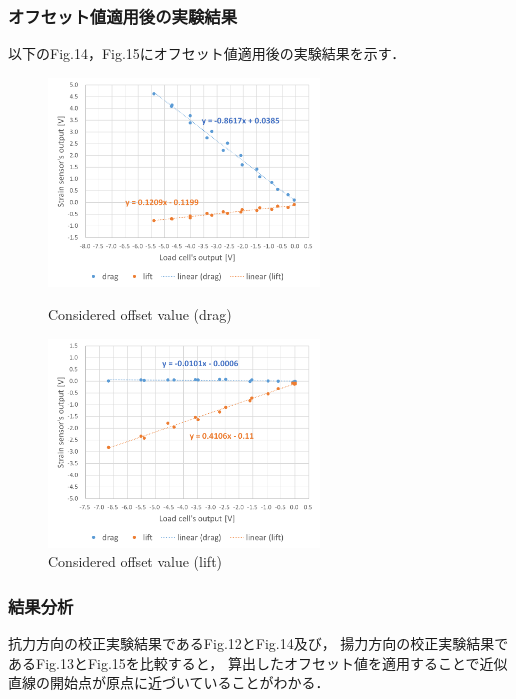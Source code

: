 \documentclass[twocolumn,a4j]{jsarticle}
\begin{document}
\subsubsection*{オフセット値適用後の実験結果}
以下のFig.14，Fig.15にオフセット値適用後の実験結果を示す．\\
\begin{figure}[htbp]
    \footnotesize
    \begin{center}
        \includegraphics[width=72mm]{../images/calibration_2_drag_offset.png}
        \caption{Considered offset value (drag)}
        \includegraphics[width=72mm]{../images/calibration_2_lift_offset.png}
        \caption{Considered offset value (lift)}
    \end{center}
\end{figure}

\subsubsection*{結果分析}

抗力方向の校正実験結果であるFig.12とFig.14及び，
揚力方向の校正実験結果であるFig.13とFig.15を比較すると，
算出したオフセット値を適用することで近似直線の開始点が原点に近づいていることがわかる．

\newpage
\end{document}
